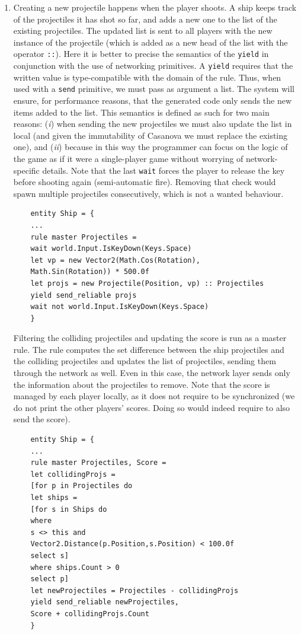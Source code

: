\begin{enumerate}
	\item Creating a new projectile happens when the player shoots. A ship keeps track of the projectiles it has shot so far, and adds a new one to the list of the existing projectiles. The updated list is sent to all players with the new instance of the projectile (which is added as a new head of the list with the operator \texttt{::}). Here it is better to precise the semantics of the \texttt{yield} in conjunction with the use of networking primitives. A \texttt{yield} requires that the written value is type-compatible with the domain of the rule. Thus, when used with a \texttt{send} primitive, we must pass as argument a list. The system will ensure, for performance reasons, that the generated code only sends the new items added to the list. This semantics is defined as such for two main reasons: (\textit{i}) when sending the new projectiles we must also update the list in local (and given the immutability of Casanova we must replace the existing one), and (\textit{ii}) because in this way the programmer can focus on the logic of the game as if it were a single-player game without worrying of network-specific details. Note that the last \texttt{wait} forces the player to release the key before shooting again (semi-automatic fire). Removing that check would spawn multiple projectiles consecutively, which is not a wanted behaviour.
	
	\begin{lstlisting}
	entity Ship = {
	...
	rule master Projectiles =
	wait world.Input.IsKeyDown(Keys.Space)
	let vp = new Vector2(Math.Cos(Rotation), 
	Math.Sin(Rotation)) * 500.0f
	let projs = new Projectile(Position, vp) :: Projectiles
	yield send_reliable projs
	wait not world.Input.IsKeyDown(Keys.Space)
	}
	\end{lstlisting}
	
	Filtering the colliding projectiles and updating the score is run as a master rule. The rule computes the set difference between the ship projectiles and the colliding projectiles and updates the list of projectiles, sending them through the network as well. Even in this case, the network layer sends only the information about the projectiles to remove. Note that the score is managed by each player locally, as it does not require to be synchronized (we do not print the other players' scores. Doing so would indeed require to also send the score).
	
	\begin{lstlisting}
	entity Ship = {
	...
	rule master Projectiles, Score =
	let collidingProjs =
	[for p in Projectiles do
	let ships =
	[for s in Ships do
	where 
	s <> this and 
	Vector2.Distance(p.Position,s.Position) < 100.0f
	select s]
	where ships.Count > 0
	select p]
	let newProjectiles = Projectiles - collidingProjs
	yield send_reliable newProjectiles, 
	Score + collidingProjs.Count 
	}
	\end{lstlisting}
\end{enumerate}

